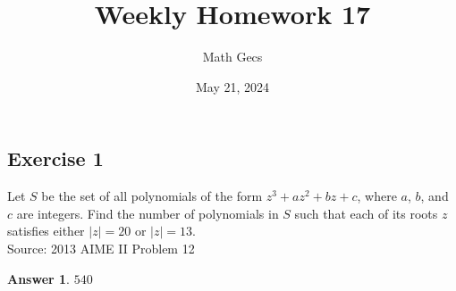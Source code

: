 \documentclass[12pt]{article}
\title{Weekly Homework 17}
\author{Math Gecs}
\date{May 21, 2024}
\newtheorem*{answer*}{Answer}
\begin{document}
\maketitle

\subsection*{Exercise 1}
Let $S$ be the set of all polynomials of the form $z^3 + az^2 + bz + c$, where $a$, $b$, and $c$ are integers. Find the number of polynomials in $S$ such that each of its roots $z$ satisfies either $|z| = 20$ or $|z| = 13$.\\

Source: 2013 AIME II Problem 12\\

\begin{answer*}
 $\boxed{540}$
\end{answer*}
\end{document}
